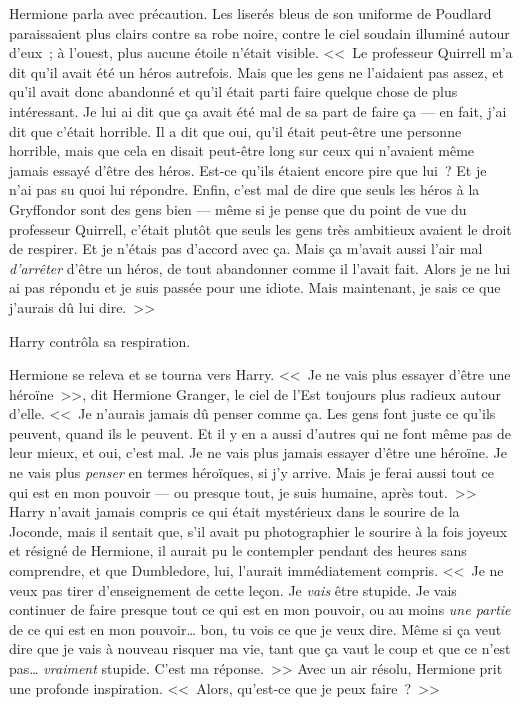 Hermione parla avec précaution. Les liserés bleus de son uniforme de Poudlard paraissaient plus clairs contre sa robe noire, contre le ciel soudain illuminé autour d'eux~; à l'ouest, plus aucune étoile n'était visible. <<~Le professeur Quirrell m'a dit qu'il avait été un héros autrefois. Mais que les gens ne l'aidaient pas assez, et qu'il avait donc abandonné et qu'il était parti faire quelque chose de plus intéressant. Je lui ai dit que ça avait été mal de sa part de faire ça — en fait, j'ai dit que c'était horrible. Il a dit que oui, qu'il était peut-être une personne horrible, mais que cela en disait peut-être long sur ceux qui n'avaient même jamais essayé d'être des héros. Est-ce qu'ils étaient encore pire que lui~? Et je n'ai pas su quoi lui répondre. Enfin, c'est mal de dire que seuls les héros à la Gryffondor sont des gens bien — même si je pense que du point de vue du professeur Quirrell, c'était plutôt que seuls les gens très ambitieux avaient le droit de respirer. Et je n'étais pas d'accord avec ça. Mais ça m'avait aussi l'air mal \emph{d'arrêter} d'être un héros, de tout abandonner comme il l'avait fait. Alors je ne lui ai pas répondu et je suis passée pour une idiote. Mais maintenant, je sais ce que j'aurais dû lui dire.~>>

Harry contrôla sa respiration.

Hermione se releva et se tourna vers Harry. <<~Je ne vais plus essayer d'être une héroïne~>>, dit Hermione Granger, le ciel de l'Est toujours plus radieux autour d'elle. <<~Je n'aurais jamais dû penser comme ça. Les gens font juste ce qu'ils peuvent, quand ils le peuvent. Et il y en a aussi d'autres qui ne font même pas de leur mieux, et oui, c'est mal. Je ne vais plus jamais essayer d'être une héroïne. Je ne vais plus \emph{penser} en termes héroïques, si j'y arrive. Mais je ferai aussi tout ce qui est en mon pouvoir — ou presque tout, je suis humaine, après tout.~>> Harry n'avait jamais compris ce qui était mystérieux dans le sourire de la Joconde, mais il sentait que, s'il avait pu photographier le sourire à la fois joyeux et résigné de Hermione, il aurait pu le contempler pendant des heures sans comprendre, et que Dumbledore, lui, l'aurait immédiatement compris. <<~Je ne veux pas tirer d'enseignement de cette leçon. Je \emph{vais} être stupide. Je vais continuer de faire presque tout ce qui est en mon pouvoir, ou au moins \emph{une partie} de ce qui est en mon pouvoir… bon, tu vois ce que je veux dire. Même si ça veut dire que je vais à nouveau risquer ma vie, tant que ça vaut le coup et que ce n'est pas… \emph{vraiment} stupide. C'est ma réponse.~>> Avec un air résolu, Hermione prit une profonde inspiration. <<~Alors, qu'est-ce que je peux faire~?~>>

